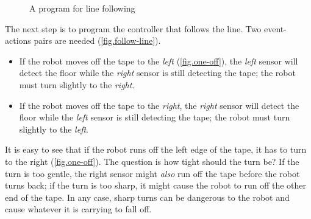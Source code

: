 \begin{figure}
\hfill
{}
\caption{A program for line following}\label{fig.follow-line-all}
\end{figure}




The next step is to program the controller that follows the line. Two
event-actions pairs are needed (\cref{fig.follow-line}).

\begin{itemize}

\item If the robot moves off the tape to the \emph{left}
(\cref{fig.one-off}), the \emph{left} sensor will detect the floor while
the \emph{right} sensor is still detecting the tape; the robot must
turn slightly to the \emph{right}.

\item If the robot moves off the tape to the \emph{right}, the
\emph{right} sensor will detect the floor while the \emph{left} sensor
is still detecting the tape; the robot must turn slightly
to the \emph{left}.

\end{itemize}



It is easy to see that if the robot runs off the left edge of the tape,
it has to turn to the right (\cref{fig.one-off}). The question is
how tight should the turn be? If the turn is too gentle, the right
sensor might \emph{also} run off the tape before the robot turns back;
if the turn is too sharp, it might cause the robot to run off the
other end of the tape. In any case, sharp turns can be dangerous to
the robot and cause whatever it is carrying to fall off.

